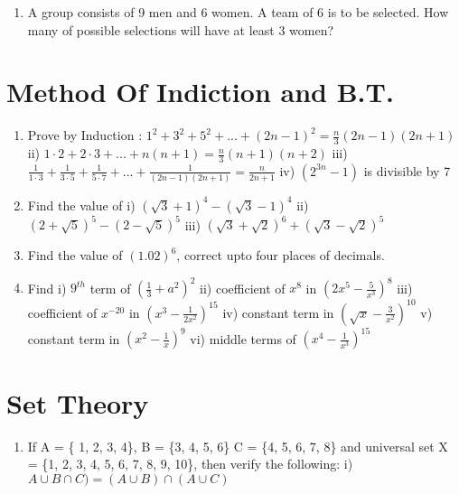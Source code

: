 \documentclass[14pt]{article}
\begin{document}
\begin{multicols}{2}
\begin{enumerate}[resume]
 \item A group consists of 9 men and 6 women.
A team of 6 is to be selected. How many
of possible selections will have at least
3 women?
\end{enumerate} 




\section{Method Of Indiction and B.T.}
\noindent
\begin{enumerate}[resume]


\item Prove by Induction : $1^2+3^2+5^2+...+(2n-1)^2 = \frac{n}{3}(2n-1)(2n+1)$ ii) $1\cdot2+2\cdot3+...+n(n+1) = \frac{n}{3}(n+1)(n+2)$ iii) $\frac{1}{1\cdot3}+\frac{1}{3\cdot5}+\frac{1}{5\cdot7}+...+\frac{1}{(2n-1)(2n+1)} = \frac{n}{2n+1}$ iv) $(2^{3n}-1)$ is divisible by 7

\item Find the value of i) $\left(\sqrt{3}+1\right)^4 - \left(\sqrt{3}-1\right)^4$ 
ii) $\left(2+\sqrt{5}\right)^5 - \left(2 -\sqrt{5}\right)^5$ iii) $\left(\sqrt{3}+\sqrt{2}\right)^6 + \left(\sqrt{3} -\sqrt{2}\right)^5$ 

\item Find the value of $(1.02)^6$, correct upto four places of decimals.

\item Find i) $9^{th}$ term of $\left(\frac{1}{3}+a^2\right)^2$ ii) coefficient of $x^8$ in $\left(2x^5 - \frac{5}{x^3}\right)^8$ iii) coefficient of $x^{-20}$ in $\left(x^3 - \frac{1}{2x^2}\right)^{15}$
iv) constant term in $\left(\sqrt{x} - \frac{3}{x^2}\right)^{10}$ v) constant term in $\left(x^2 - \frac{1}{x}\right)^9$
vi) middle terms of $\left(x^4 - \frac{1}{x^3}\right)^{15}$

\end{enumerate} 


\section{Set Theory}
\noindent
\begin{enumerate}[resume]

\item  If A = \{ 1, 2, 3, 4\}, B = \{3, 4, 5, 6\}
		  C = \{4, 5, 6, 7, 8\} and universal set  X = \{1, 2, 3, 4, 5, 6, 7, 8, 9, 10\}, then verify
the following:
i)		$ A \cup B\cap C) = (A\cup B) \cap (A \cup C)$


\end{enumerate}
\end{multicols}
\end{document}
